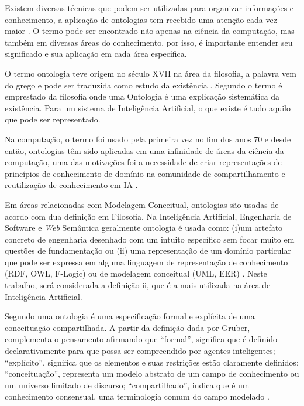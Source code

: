 \documentclass{bcc}
\begin{document}
Existem diversas técnicas que podem ser utilizadas para organizar informações e conhecimento, a aplicação de ontologias tem recebido uma atenção cada vez maior \cite{almeida2014}. O termo pode ser encontrado não apenas na ciência da computação, mas também em diversas áreas do conhecimento, por isso, é importante entender seu significado e sua aplicação em cada área específica.

O termo ontologia teve origem no século XVII na área da filosofia, a palavra vem do grego e pode ser traduzida como estudo da existência \cite{guizzardi2005}. Segundo \cite{gruber1995} o termo é emprestado da filosofia onde uma Ontologia é uma explicação sistemática da existência. Para um sistema de Inteligência Artificial, o que existe é tudo aquilo que pode ser representado.

Na computação, o termo foi usado pela primeira vez no fim dos anos 70 e desde então, ontologias têm sido aplicadas em uma infinidade de áreas da ciência da computação, uma das motivações foi a necessidade de criar representações de princípios de conhecimento de domínio na comunidade de compartilhamento e reutilização de conhecimento em IA \cite{guizzardi2005}.

Em áreas relacionadas com Modelagem Conceitual, ontologias são usadas de acordo com dua definição em Filosofia. Na Inteligência Artificial, Engenharia de Software e \textit{Web} Semântica geralmente ontologia é usada como: (i)um artefato concreto de engenharia desenhado com um intuito específico sem focar muito em questões de fundamentação ou (ii) uma representação de um domínio particular que pode ser expressa em alguma linguagem de representação de conhecimento (RDF, OWL, F-Logic) ou de modelagem conceitual (UML, EER) \cite{guizzardi2008}. Neste trabalho, será considerada a definição ii, que é a mais utilizada na área de Inteligência Artificial.

Segundo \cite{gruber1995} uma ontologia é uma especificação formal e explícita de uma conceituação compartilhada. A partir da definição dada por Gruber, \cite{rocha2014} complementa o pensamento afirmando que “formal”, significa que é definido declarativamente para que possa ser compreendido por agentes inteligentes; “explícito”, significa que os elementos e suas restrições estão claramente definidos; “conceituação”, representa um modelo abstrato de um campo de conhecimento ou um universo limitado de discurso; “compartilhado”, indica que é um conhecimento consensual, uma terminologia comum do campo modelado \cite{rocha2014}.
\end{document}

